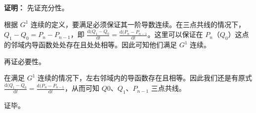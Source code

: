 \documentclass[UTF8]{ctexart}
\begin{document}
\textbf{证明：}
先证充分性。

根据 $G^1$ 连续的定义，要满足必须保证其一阶导数连续。在三点共线的情况下，$Q_1 - Q_0 = P_n - P_{n-1}$，即 $\frac{\mathrm{d} (Q_1 - Q_0} {\mathrm{d} t} = \frac{\mathrm{d} (P_n - P_{n-1}} {\mathrm{d} t}$。这里可以保证在 $P_n$（$Q_0$）这点的邻域内导函数处处存在且处处相等。因此可知他们满足 $G^1$ 连续。
\newline

再证必要性。

在满足 $G^1$ 连续的情况下，左右邻域内的导函数存在且相等。因此我们还是有原式 $\frac{\mathrm{d} (Q_1 - Q_0} {\mathrm{d} t} = \frac{\mathrm{d} (P_n - P_{n-1}} {\mathrm{d} t}$，从而可知 $Q0$、$Q_1$、$P_{n-1}$ 三点共线。

证毕。
\end{document}
